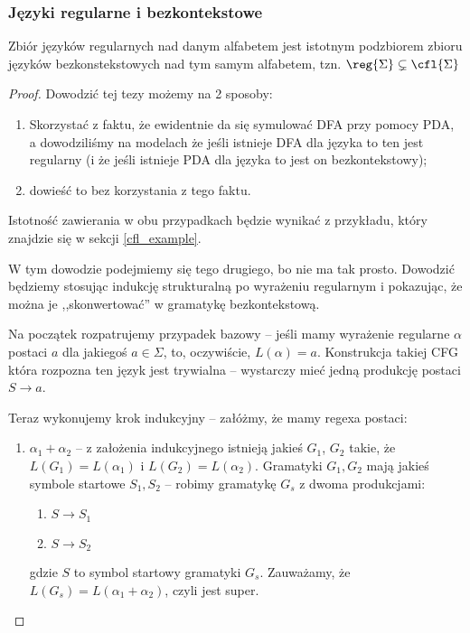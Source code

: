 \subsubsection{Języki regularne i bezkontekstowe}

\begin{theorem}
	Zbiór języków regularnych nad danym alfabetem jest istotnym podzbiorem zbioru języków bezkonstekstowych nad tym samym alfabetem, tzn. \(\reg{\Sigma} \subsetneq  \cfl{\Sigma}\)
\end{theorem}

\begin{proof}
	Dowodzić tej tezy możemy na 2 sposoby:

	\begin{enumerate}
		\item Skorzystać z faktu, że ewidentnie da się symulować DFA przy pomocy PDA, a dowodziliśmy na modelach że jeśli istnieje DFA dla języka to ten jest regularny (i że jeśli istnieje PDA dla języka to jest on bezkontekstowy);
		\item dowieść to bez korzystania z tego faktu.
	\end{enumerate}

	Istotność zawierania w obu przypadkach będzie wynikać z przykładu, który znajdzie się w sekcji \ref{cfl_example}.

	W tym dowodzie podejmiemy się tego drugiego, bo nie ma tak prosto. Dowodzić będziemy stosując indukcję strukturalną po wyrażeniu regularnym i pokazując, że można je ,,skonwertować'' w gramatykę bezkontekstową.

	Na początek rozpatrujemy przypadek bazowy -- jeśli mamy wyrażenie regularne \(\alpha\) postaci \(a\) dla jakiegoś \(a \in \Sigma\), to, oczywiście, \(L(\alpha) = a\). Konstrukcja takiej CFG która rozpozna ten język jest trywialna -- wystarczy mieć jedną produkcję postaci \(S \rightarrow a\).

	Teraz wykonujemy krok indukcyjny -- załóżmy, że mamy regexa postaci:

	\begin{enumerate}
		\item \( \alpha_1 + \alpha_2\) -- z założenia indukcyjnego istnieją jakieś \(G_1\), \(G_2\) takie, że \(L(G_1) = L(\alpha_1)\) i \(L(G_2) = L(\alpha_2)\). Gramatyki \(G_1, G_2\) mają jakieś symbole startowe \(S_1, S_2\) -- robimy gramatykę \(G_s\) z dwoma produkcjami:
		      \begin{enumerate}
			      \item \(S \rightarrow S_1\)
			      \item \(S \rightarrow S_2\)
		      \end{enumerate}
		      gdzie \(S\) to symbol startowy gramatyki \(G_s\). Zauważamy, że \(L(G_s) = L(\alpha_1 + \alpha_2)\), czyli jest super.


\end{enumerate}
\end{proof}
